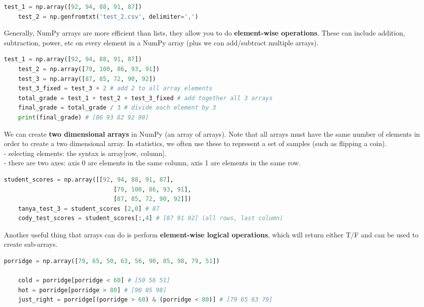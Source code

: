 \documentclass[11pt, a4paper]{article}
\begin{document}
\begin{spacing}{1.1}
\begin{lstlisting}[language=Python]
	test_1 = np.array([92, 94, 88, 91, 87])
	test_2 = np.genfromtxt('test_2.csv', delimiter=',') \end{lstlisting}\vspace*{1mm}
	Generally, NumPy arrays are more efficient than lists, they allow you to do \textbf{element-wise operations}. These can include addition, subtraction, power, etc on every element in a NumPy array (plus we can add/subtract multiple arrays). 
	\begin{lstlisting}[language=Python]
	test_1 = np.array([92, 94, 88, 91, 87])
	test_2 = np.array([79, 100, 86, 93, 91])
	test_3 = np.array([87, 85, 72, 90, 92])
	test_3_fixed = test_3 + 2 # add 2 to all array elements
	total_grade = test_1 + test_2 + test_3_fixed # add together all 3 arrays
	final_grade = total_grade / 3 # divide each element by 3
	print(final_grade) # [86 93 82 92 90] \end{lstlisting}\vspace*{1mm}
	We can create \textbf{two dimensional arrays} in NumPy (an array of arrays). Note that all arrays must have the same number of elements in order to create a two dimensional array. In statistics, we often use these to represent a set of samples (such as flipping a coin). \\
	\hspace*{3mm} - selecting elements: the syntax is array[row, column]. \\
	\hspace*{3mm} - there are two axes: axis 0 are elements in the same column, axis 1 are elements in the same row.
	\begin{lstlisting}[language=Python]
	student_scores = np.array([[92, 94, 88, 91, 87],
	                           [79, 100, 86, 93, 91],
	                           [87, 85, 72, 90, 92]])
	tanya_test_3 = student_scores [2,0] # 87
	cody_test_scores = student_scores[:,4] # [87 91 92] (all rows, last column) \end{lstlisting}\vspace*{1mm}
	Another useful thing that arrays can do is perform \textbf{element-wise logical operations}, which will return either T/F and can be used to create sub-arrays. 
	\begin{lstlisting}[language=Python]
	porridge = np.array([79, 65, 50, 63, 56, 90, 85, 98, 79, 51])
	
	cold = porridge[porridge < 60] # [50 56 51]
	hot = porridge[porridge > 80] # [90 85 98]
	just_right = porridge[(porridge > 60) & (porridge < 80)] # [79 65 63 79] \end{lstlisting}\vspace*{4mm}
	

\end{spacing}
\end{document}

